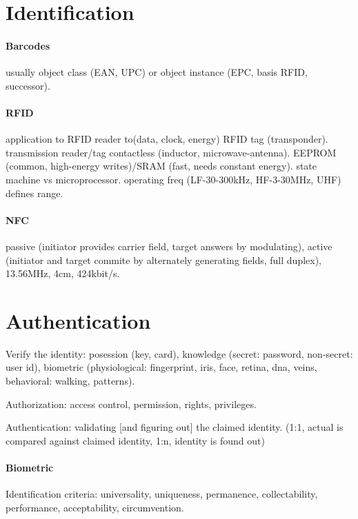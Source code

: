 \documentclass{article}
\begin{document}
\begin{multicols}{2}

    \section{Identification}

    \paragraph{Barcodes} usually object class (EAN, UPC) or object instance (EPC, basis RFID, successor).

    \paragraph{RFID} application to RFID reader to(data, clock, energy) RFID tag (transponder). transmission reader/tag contactless (inductor, microwave-antenna). EEPROM (common, high-energy writes)/SRAM (fast, needs constant energy). state machine vs microprocessor. operating freq (LF-30-300kHz, HF-3-30MHz, UHF) defines range.

    \paragraph{NFC} passive (initiator provides carrier field, target answers by modulating), active (initiator and target commite by alternately generating fields, full duplex), 13.56MHz, 4cm, 424kbit/s.

    \section{Authentication}

    Verify the identity: posession (key, card), knowledge (secret: password, non-secret: user id), biometric (physiological: fingerprint, iris, face, retina, dna, veins, behavioral: walking, patterns).

    Authorization: access control, permission, rights, privileges.

    Authentication: validating [and figuring out] the claimed identity. (1:1, actual is compared against claimed identity, 1:n, identity is found out)

    \paragraph{Biometric} Identification criteria: universality, uniqueness, permanence, collectability, performance, acceptability, circumvention.


\end{multicols}
\end{document}
